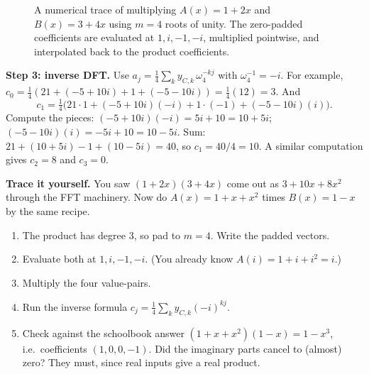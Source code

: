 \begin{figure}[htbp]
\centering
{}
\caption{A numerical trace of multiplying $A(x)=1+2x$ and $B(x)=3+4x$ using $m=4$ roots of unity. The zero-padded coefficients are evaluated at $1, i, -1, -i$, multiplied pointwise, and interpolated back to the product coefficients.}
\label{ch29:fig-numerical-trace}
\end{figure}
\textbf{Step 3: inverse DFT.} Use $a_j = \tfrac14\sum_k y_{C,k}\,\omega_4^{-kj}$ with
$\omega_4^{-1} = -i$. For example, $c_0 = \tfrac14(21 + (-5+10i) + 1 + (-5-10i))
= \tfrac14(12) = 3.$ And
\[
c_1 = \tfrac14\big(21\cdot 1 + (-5+10i)(-i) + 1\cdot(-1) + (-5-10i)(i)\big).
\]
Compute the pieces: $(-5+10i)(-i) = 5i + 10 = 10 + 5i$; \ $(-5-10i)(i) = -5i + 10 =
10 - 5i$. Sum: $21 + (10+5i) - 1 + (10-5i) = 40$, so $c_1 = 40/4 = 10$. A similar
computation gives $c_2 = 8$ and $c_3 = 0$.

\begin{labbox}
\textbf{Trace it yourself.} You saw $(1+2x)(3+4x)$ come out as
$3 + 10x + 8x^2$ through the FFT machinery. Now do
$A(x)=1+x+x^2$ times $B(x)=1-x$ by the same recipe.
\begin{enumerate}
\item The product has degree $3$, so pad to $m=4$. Write the padded vectors.
\item Evaluate both at $1,i,-1,-i$. (You already know $A(i)=1+i+i^2 = i$.)
\item Multiply the four value-pairs.
\item Run the inverse formula $c_j=\tfrac14\sum_k y_{C,k}(-i)^{kj}$.
\item Check against the schoolbook answer
$(1+x+x^2)(1-x) = 1 - x^3$, i.e.\ coefficients $(1,0,0,-1)$. Did the
imaginary parts cancel to (almost) zero? They must, since real inputs give a real
product.
\end{enumerate}
\end{labbox}

